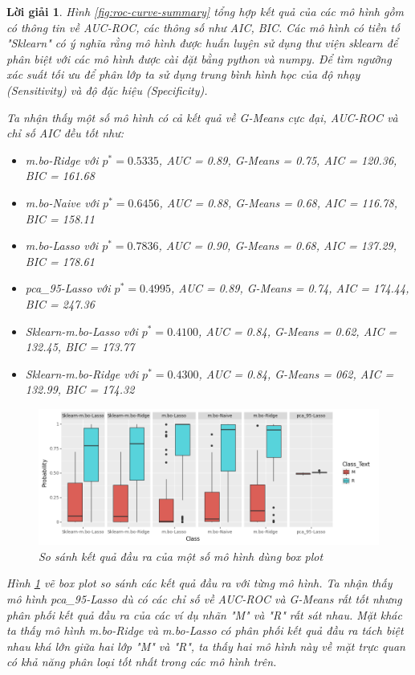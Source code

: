 \documentclass[14pt, a4paper]{article}
\theoremstyle{sltheorem}
\theoremstyle{soltheorem}
\newtheorem*{loigiai}{Lời giải}
\begin{document}
\begin{loigiai}
    Hình \ref{fig:roc-curve-summary} tổng hợp kết quả của các mô hình gồm có thông tin về AUC-ROC, các thông số như AIC, BIC.
    Các mô hình có tiền tố "Sklearn" có ý nghĩa rằng mô hình được huấn luyện sử dụng thư viện sklearn để phân biệt với các mô hình được cài đặt bằng python và numpy.
    Để tìm ngưỡng xác suất tối ưu để phân lớp ta sử dụng trung bình hình học của độ nhạy (Sensitivity) và độ đặc hiệu (Specificity).

    Ta nhận thấy một số mô hình có cả kết quả về G-Means cực đại, AUC-ROC và chỉ số AIC đều tốt như:

    \begin{itemize}
        \item m.bo-Ridge với $p^*=0.5335$, AUC = 0.89, G-Means = 0.75, AIC = 120.36, BIC = 161.68
        \item m.bo-Naive với $p^*=0.6456$, AUC = 0.88, G-Means = 0.68, AIC = 116.78, BIC = 158.11
        \item m.bo-Lasso với $p^*= 0.7836$, AUC = 0.90, G-Means = 0.68, AIC = 137.29, BIC = 178.61
        \item pca\_95-Lasso với $p^*= 0.4995$, AUC = 0.89, G-Means = 0.74, AIC = 174.44, BIC = 247.36
        \item Sklearn-m.bo-Lasso với $p^*= 0.4100$, AUC = 0.84, G-Means = 0.62, AIC = 132.45, BIC = 173.77
        \item Sklearn-m.bo-Ridge với $p^*= 0.4300$, AUC = 0.84, G-Means = 062, AIC = 132.99, BIC = 174.32
    \end{itemize}

    \begin{figure}[h!]
        \centering
        \includegraphics[width=1.0\textwidth]{figures/prob_box_plot.png}
        \caption{So sánh kết quả đầu ra của một số mô hình dùng box plot}
        \label{fig:prob-box-plot}
    \end{figure}

    Hình \ref{fig:prob-box-plot} vẽ box plot so sánh các kết quả đầu ra với từng mô hình.
    Ta nhận thấy mô hình pca\_95-Lasso dù có các chỉ số về AUC-ROC và G-Means rất tốt nhưng phân phối kết quả đầu ra của các ví dụ nhãn "M" và "R" rất sát nhau.
    Mặt khác ta thấy mô hình m.bo-Ridge và m.bo-Lasso có phân phối kết quả đầu ra tách biệt nhau khá lớn giữa hai lớp "M" và "R", ta thấy hai mô hình này về mặt trực quan có khả năng phân loại tốt nhất trong các mô hình trên.


\end{loigiai}
\end{document}

